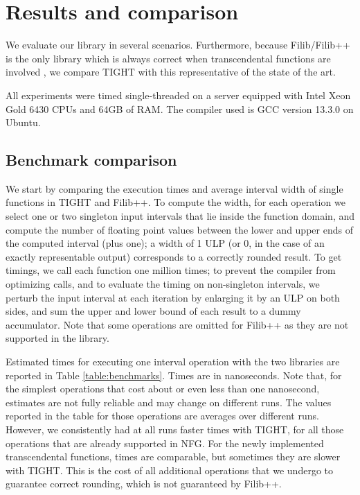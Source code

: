 
\section{Results and comparison}
\label{sec:results}
We evaluate our library in several scenarios. Furthermore, because Filib/Filib++ is the only library which is always correct when transcendental functions are involved \cite{tang2022}, we compare TIGHT with this representative of the state of the art.

All experiments were timed single-threaded on a server equipped with Intel Xeon Gold 6430 CPUs and 64GB of RAM.
The compiler used is GCC version 13.3.0 on Ubuntu.

\subsection{Benchmark comparison}
We start by comparing the execution times and average interval width of single functions in TIGHT and Filib++.
To compute the width, for each operation we select one or two singleton input intervals that lie inside the function domain, and compute the number of floating point values between the lower and upper ends of the computed interval (plus one); a width of 1 ULP (or 0, in the case of an exactly representable output) corresponds to a correctly rounded result.
To get timings, we call each function one million times; to prevent the compiler from optimizing calls, and to evaluate the timing on non-singleton intervals, we perturb the input interval at each iteration by enlarging it by an ULP on both sides, and sum the upper and lower bound of each result to a dummy accumulator.
Note that some operations are omitted for Filib++ as they are not supported in the library.

Estimated times for executing one interval operation with the two libraries are reported in Table \ref{table:benchmarks}. 
Times are in nanoseconds. 
Note that, for the simplest operations that cost about or even less than one nanosecond, estimates are not fully reliable and may change on different runs.  
The values reported in the table for those operations are averages over different runs. 
However, we consistently had at all runs faster times with TIGHT, for all those operations that are already supported in NFG.   
For the newly implemented transcendental functions, times are comparable, but sometimes they are slower with TIGHT.
This is the cost of all additional operations that we undergo to guarantee correct rounding, which is not guaranteed by Filib++.


